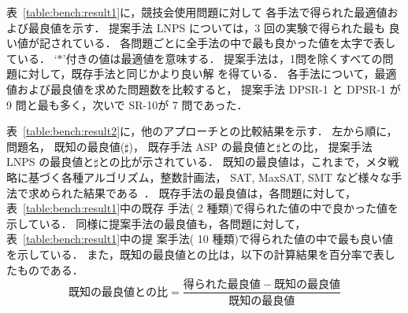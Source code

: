 
表~\ref{table:bench:result1}に，競技会使用問題に対して
各手法で得られた最適値および最良値を示す．
提案手法 LNPS については，3 回の実験で得られた最も
良い値が記されている．
各問題ごとに全手法の中で最も良かった値を太字で表している．
`$\ast$'付きの値は最適値を意味する．
提案手法は，1問を除くすべての問題に対して，既存手法と同じかより良い解
を得ている．
各手法について，最適値および最良値を求めた問題数を比較すると，
提案手法 \textsf{DPSR-1} と \textsf{DPSR-1} が 9 問と最も多く，次いで
\textsf{SR-10}が 7 問であった．


表~\ref{table:bench:result2}に，他のアプローチとの比較結果を示す．
左から順に，
問題名，
既知の最良値($\sharp$)，
既存手法 ASP の最良値と$\sharp$との比，
提案手法 LNPS の最良値と$\sharp$との比が示されている．
既知の最良値は，これまで，メタ戦略に基づく各種アルゴリズム，整数計画法，
SAT, MaxSAT, SMT など様々な手法で求められた結果である~\cite{anor/Banbara2019}．
既存手法の最良値は，各問題に対して，表~\ref{table:bench:result1}中の既存
手法( 2 種類)で得られた値の中で良かった値を示している．
同様に提案手法の最良値も，各問題に対して，表~\ref{table:bench:result1}中の提
案手法( 10 種類)で得られた値の中で最も良い値を示している．
また，既知の最良値との比は，以下の計算結果を百分率で表したものである．
\[
既知の最良値との比 = \frac{得られた最良値 - 既知の最良値}{既知の最良値}
\]

